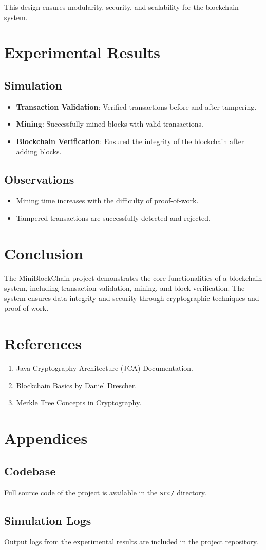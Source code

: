 \documentclass[12pt]{article}
\begin{document}
This design ensures modularity, security, and scalability for the blockchain system.

\section{Experimental Results}
\subsection{Simulation}
\begin{itemize}
    \item \textbf{Transaction Validation}: Verified transactions before and after tampering.
    \item \textbf{Mining}: Successfully mined blocks with valid transactions.
    \item \textbf{Blockchain Verification}: Ensured the integrity of the blockchain after adding blocks.
\end{itemize}

\subsection{Observations}
\begin{itemize}
    \item Mining time increases with the difficulty of proof-of-work.
    \item Tampered transactions are successfully detected and rejected.
\end{itemize}

\section{Conclusion}
The MiniBlockChain project demonstrates the core functionalities of a blockchain system, including transaction validation, mining, and block verification. The system ensures data integrity and security through cryptographic techniques and proof-of-work.

\section{References}
\begin{enumerate}
    \item Java Cryptography Architecture (JCA) Documentation.
    \item Blockchain Basics by Daniel Drescher.
    \item Merkle Tree Concepts in Cryptography.
\end{enumerate}

\section{Appendices}
\subsection{Codebase}
Full source code of the project is available in the \texttt{src/} directory.

\subsection{Simulation Logs}
Output logs from the experimental results are included in the project repository.
\end{document}
